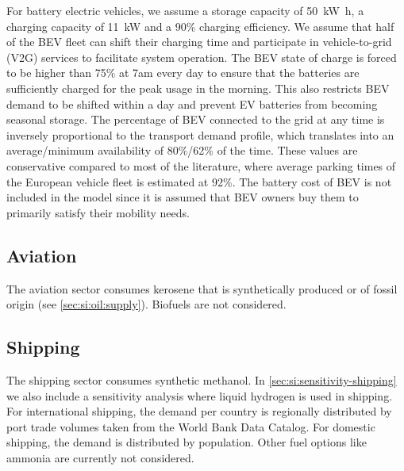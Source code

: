For battery electric vehicles, we assume a storage capacity of
\SI{50}{\kilo\watt\hour}, a charging capacity of \SI{11}{\kilo\watt} and a 90\%
charging efficiency. We assume that half of the BEV fleet can shift their
charging time and participate in vehicle-to-grid (V2G) services to facilitate
system operation. The BEV state of charge is forced to be higher than 75\% at
7am every day to ensure that the batteries are sufficiently charged for the peak
usage in the morning. This also restricts BEV demand to be shifted within a day
and prevent EV batteries from becoming seasonal storage. The percentage of BEV
connected to the grid at any time is inversely proportional to the transport
demand profile, which translates into an average/minimum availability of
80\%/62\% of the time. These values are conservative compared to most of the
literature, where average parking times of the European vehicle fleet is
estimated at 92\%. The battery cost of BEV is not included in the model
since it is assumed that BEV owners buy them to primarily satisfy their mobility
needs.

\subsection{Aviation}
\label{sec:si:transport:aviation}

The aviation sector consumes kerosene that is synthetically produced or of
fossil origin (see \cref{sec:si:oil:supply}). Biofuels are not considered.

\subsection{Shipping}
\label{sec:si:transport:shipping}

The shipping sector consumes synthetic methanol. In
\cref{sec:si:sensitivity-shipping} we also include a sensitivity analysis where
liquid hydrogen is used in shipping. For international shipping, the demand per
country is regionally distributed by port trade volumes taken from the World
Bank Data Catalog. For domestic shipping, the demand is
distributed by population. Other fuel options like ammonia are currently not
considered.